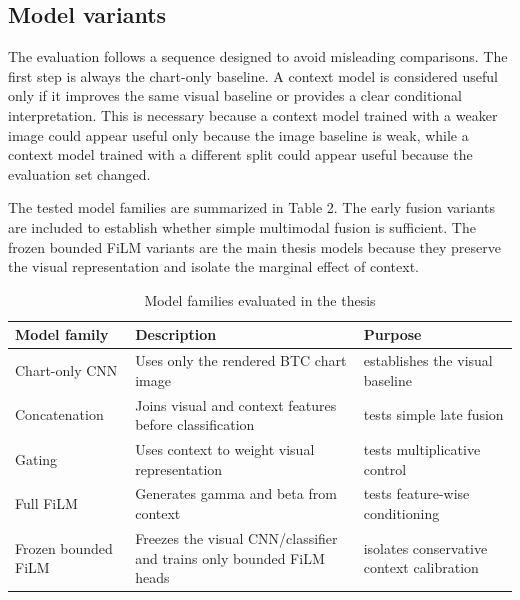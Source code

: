 \documentclass[14pt,a4paper]{extarticle}
\begin{document}
\subsection{Model variants}

The evaluation follows a sequence designed to avoid misleading comparisons. The first step is always the chart-only baseline. A context model is considered useful only if it improves the same visual baseline or provides a clear conditional interpretation. This is necessary because a context model trained with a weaker image could appear useful only because the image baseline is weak, while a context model trained with a different split could appear useful because the evaluation set changed.

The tested model families are summarized in Table 2. The early fusion variants are included to establish whether simple multimodal fusion is sufficient. The frozen bounded FiLM variants are the main thesis models because they preserve the visual representation and isolate the marginal effect of context.

\begin{table}[H]
\caption{Model families evaluated in the thesis}
\begin{center}
\begin{tabular}{>{\raggedright\arraybackslash}p{}>{\raggedright\arraybackslash}p{}>{\raggedright\arraybackslash}p{}}
\toprule
\textbf{Model family} & \textbf{Description} & \textbf{Purpose}\\
\midrule
Chart-only CNN & Uses only the rendered BTC chart image & establishes the visual baseline\\
Concatenation & Joins visual and context features before classification & tests simple late fusion\\
Gating & Uses context to weight visual representation & tests multiplicative control\\
Full FiLM & Generates gamma and beta from context & tests feature-wise conditioning\\
Frozen bounded FiLM & Freezes the visual CNN/classifier and trains only bounded FiLM heads & isolates conservative context calibration\\
\bottomrule
\end{tabular}
\end{center}
\end{table}
\end{document}
